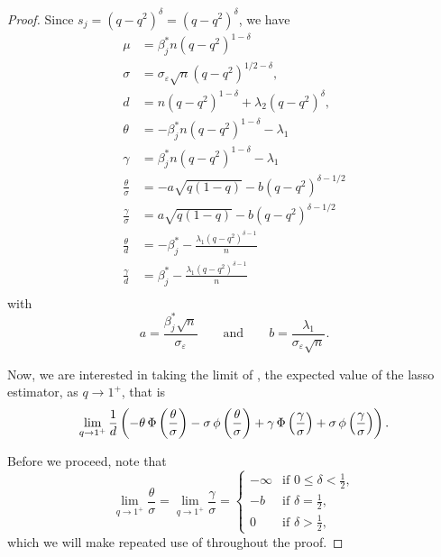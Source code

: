 \begin{proof}

  Since \(s_j = (q - q^2)^\delta = (q - q^2)^\delta\), we have
  \[
    \begin{aligned}
      \mu                   & = \beta_j^* n (q - q^2)^{1 - \delta}                      \\
      \sigma                & = \sigma_\varepsilon \sqrt{n} (q - q^2)^{1/2 - \delta},   \\
      d                     & = n (q - q^2)^{1 - \delta} + \lambda_2 (q - q^2)^\delta,  \\
      \theta                & = -\beta^*_j n (q - q^2)^{1-\delta} - \lambda_1           \\
      \gamma                & = \beta^*_j n (q - q^2)^{1-\delta} - \lambda_1            \\
      \frac{\theta}{\sigma} & = -a \sqrt{q(1-q)} - b (q - q^2)^{\delta - 1/2}           \\
      \frac{\gamma}{\sigma} & = a \sqrt{q(1-q)} - b (q - q^2)^{\delta - 1/2}            \\
      \frac{\theta}{d}      & = -\beta_j^* - \frac{\lambda_1 (q - q^2)^{\delta - 1}}{n} \\
      \frac{\gamma}{d}      & = \beta_j^* - \frac{\lambda_1 (q - q^2)^{\delta - 1}}{n}  \\
    \end{aligned}
  \]
  with
  \[
    a = \frac{\beta_j^* \sqrt{n}}{\sigma_\varepsilon} \qquad \text{and} \qquad b = \frac{\lambda_1}{\sigma_\varepsilon \sqrt{n}}.
  \]

  Now, we are interested in taking the limit of , the expected value of the lasso estimator, as \(q \rightarrow 1^+\), that is
  \begin{equation}
    \label{eq:eval-qlimit}
    \lim_{q \rightarrow 1^+}\frac{1}{d}\left(-\theta \operatorname{\Phi}\left(\frac{\theta}{\sigma}\right) - \sigma \operatorname{\phi}\left(\frac{\theta}{\sigma}\right) + \gamma \operatorname{\Phi}\left(\frac{\gamma}{\sigma}\right) + \sigma \operatorname{\phi}\left(\frac{\gamma}{\sigma}\right)\right).
  \end{equation}

  Before we proceed, note that
  \begin{equation}
    \label{eq:eval-sigma-limits}
    \lim_{q \rightarrow 1^+} \frac{\theta}{\sigma} = \lim_{q \rightarrow 1^+} \frac{\gamma}{\sigma} =
    \begin{cases}
      -\infty & \text{if } 0 \leq \delta < \frac{1}{2}, \\
      -b      & \text{if } \delta = \frac{1}{2},        \\
      0       & \text{if } \delta > \frac{1}{2},
    \end{cases}
  \end{equation}
  which we will make repeated use of throughout the proof.


\end{proof}
